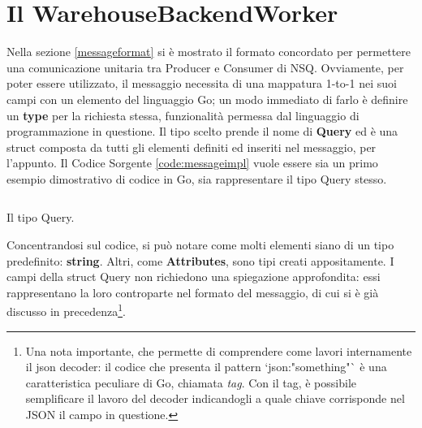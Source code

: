 \section{Il WarehouseBackendWorker}
Nella sezione \ref{messageformat} si è mostrato il formato concordato per permettere una comunicazione unitaria tra Producer e Consumer di NSQ. Ovviamente, per poter essere utilizzato, il messaggio necessita di una mappatura 1-to-1 nei suoi campi con un elemento del linguaggio Go; un modo immediato di farlo è definire un \textbf{type} per la richiesta stessa, funzionalità permessa dal linguaggio di programmazione in questione. Il tipo scelto prende il nome di \textbf{Query} ed è una struct composta da tutti gli elementi definiti ed inseriti nel messaggio, per l'appunto. Il Codice Sorgente \ref{code:messageimpl} vuole essere sia un primo esempio dimostrativo di codice in Go, sia rappresentare il tipo Query stesso. 
\begin{listing}[h!]
\inputminted[baselinestretch=0.8]{go}{sources/query.go}
\caption{Il tipo Query.}
\label{code:messageimpl}
\end{listing}
Concentrandosi sul codice, si può notare come molti elementi siano di un tipo predefinito: \textbf{string}. Altri, come \textbf{Attributes}, sono tipi creati appositamente. I campi della struct Query non richiedono una spiegazione approfondita: essi rappresentano la loro controparte nel formato del messaggio, di cui si è già discusso in precedenza\footnote{Una nota importante, che permette di comprendere come lavori internamente il json decoder: il codice che presenta il pattern `json:"something"` è una caratteristica peculiare di Go, chiamata \textit{tag}. Con il tag, è possibile semplificare il lavoro del decoder indicandogli a quale chiave corrisponde nel JSON il campo in questione.}.


